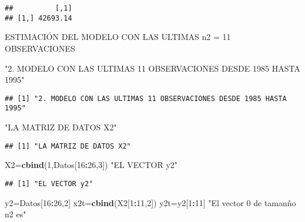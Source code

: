 \documentclass[
]{article}
\newenvironment{Shaded}{\begin{snugshade}}{\end{snugshade}}
\newcommand{\DecValTok}[1]{\textcolor[rgb]{0.00,0.00,0.81}{#1}}
\newcommand{\KeywordTok}[1]{\textcolor[rgb]{0.13,0.29,0.53}{\textbf{#1}}}
\newcommand{\NormalTok}[1]{#1}
\newcommand{\OperatorTok}[1]{\textcolor[rgb]{0.81,0.36,0.00}{\textbf{#1}}}
\newcommand{\StringTok}[1]{\textcolor[rgb]{0.31,0.60,0.02}{#1}}
\begin{document}
\begin{verbatim}
##          [,1]
## [1,] 42693.14
\end{verbatim}

ESTIMACIÓN DEL MODELO CON LAS ULTIMAS n2 = 11 OBSERVACIONES

\begin{Shaded}
\begin{Highlighting}[]
\StringTok{"2. MODELO CON LAS ULTIMAS 11 OBSERVACIONES DESDE 1985 HASTA 1995"}
\end{Highlighting}
\end{Shaded}

\begin{verbatim}
## [1] "2. MODELO CON LAS ULTIMAS 11 OBSERVACIONES DESDE 1985 HASTA 1995"
\end{verbatim}

\begin{Shaded}
\begin{Highlighting}[]
\StringTok{"LA MATRIZ DE DATOS X2"}
\end{Highlighting}
\end{Shaded}

\begin{verbatim}
## [1] "LA MATRIZ DE DATOS X2"
\end{verbatim}

\begin{Shaded}
\begin{Highlighting}[]
\NormalTok{X2=}\KeywordTok{cbind}\NormalTok{(}\DecValTok{1}\NormalTok{,Datos[}\DecValTok{16}\OperatorTok{:}\DecValTok{26}\NormalTok{,}\DecValTok{3}\NormalTok{])}
\StringTok{"EL VECTOR y2"}
\end{Highlighting}
\end{Shaded}

\begin{verbatim}
## [1] "EL VECTOR y2"
\end{verbatim}

\begin{Shaded}
\begin{Highlighting}[]
\NormalTok{y2=Datos[}\DecValTok{16}\OperatorTok{:}\DecValTok{26}\NormalTok{,}\DecValTok{2}\NormalTok{]}
\NormalTok{x2t=}\KeywordTok{cbind}\NormalTok{(X2[}\DecValTok{1}\OperatorTok{:}\DecValTok{11}\NormalTok{,}\DecValTok{2}\NormalTok{])}
\NormalTok{y2t=y2[}\DecValTok{1}\OperatorTok{:}\DecValTok{11}\NormalTok{]}
\StringTok{"El vector 0 de tamanño n2 es"}
\end{Highlighting}
\end{Shaded}
\end{document}
